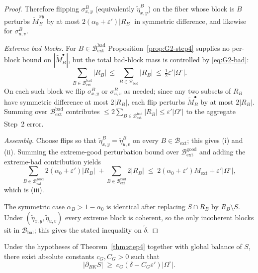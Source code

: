 \begin{proof}
Therefore flipping $\sigma_{x,y}^B$ (equivalently $\tilde\eta_{x,y}^B$)
on the fiber whose block is $B$ perturbs $\tilde M_B^{xy}$ by at most
$2(\alpha_0+\varepsilon')|R_B|$ in symmetric difference, and likewise for
$\sigma_{u,v}^B$.

\emph{Extreme bad blocks.} For $B\in\mathcal B_{\mathrm{ext}}^{\mathrm{bad}}$
Proposition~\ref{prop:G2-step4} supplies no per-block bound on
$|\tilde M_B^\bullet|$, but the total bad-block mass is controlled by
\eqref{eq:G2-bad}:
\[
\sum_{B\in\mathcal B_{\mathrm{ext}}^{\mathrm{bad}}}|R_B|
\,\le\,\sum_{B\in\mathcal B_{\mathrm{bad}}}|R_B|
\,\le\,\tfrac{1}{2}\varepsilon'|\Omega^\circ|.
\]
On each such block we flip $\sigma_{x,y}^B$ or $\sigma_{u,v}^B$ as needed;
since any two subsets of $R_B$ have symmetric difference at most $2|R_B|$,
each flip perturbs $\tilde M_B^\bullet$ by at most $2|R_B|$. Summing
over $\mathcal B_{\mathrm{ext}}^{\mathrm{bad}}$ contributes
$\le 2\sum_{B\in\mathcal B_{\mathrm{ext}}^{\mathrm{bad}}}|R_B|
\le\varepsilon'|\Omega^\circ|$ to the aggregate Step~2 error.

\emph{Assembly.} Choose flips so that
$\tilde\eta_{x,y}^B=\tilde\eta_{u,v}^B$ on every
$B\in\mathcal B_{\mathrm{ext}}$; this gives (i) and (ii). Summing the
extreme-good perturbation bound over $\mathcal B_{\mathrm{ext}}^{\mathrm{good}}$
and adding the extreme-bad contribution yields
\[
\sum_{B\in\mathcal B_{\mathrm{ext}}^{\mathrm{good}}}\!\!2(\alpha_0+\varepsilon')|R_B|
\;+\sum_{B\in\mathcal B_{\mathrm{ext}}^{\mathrm{bad}}}\!\!2|R_B|
\;\le\;2(\alpha_0+\varepsilon')M_{\mathrm{ext}}+\varepsilon'|\Omega^\circ|,
\]
which is (iii).

The symmetric case $\alpha_B>1-\alpha_0$ is identical after replacing
$S\cap R_B$ by $R_B\setminus S$. Under $(\tilde\eta_{x,y},\tilde\eta_{u,v})$
every extreme block is coherent, so the only incoherent blocks sit in
$\mathcal B_{\mathrm{bal}}$; this gives the stated inequality on
$\tilde\delta$.
\end{proof}

\begin{proposition}\label{prop:G5}
Under the hypotheses of Theorem~\ref{thm:step4} together with global
balance of $S$, there exist absolute constants $c_G,C_G>0$ such that
\[
|\partial_{BK}S|\;\ge\;c_G(\delta-C_G\varepsilon')|\Omega^\circ|.
\]
\end{proposition}

